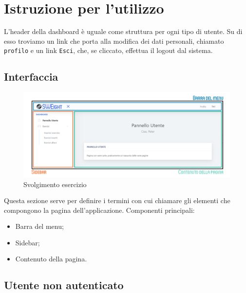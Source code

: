 \section{Istruzione per l'utilizzo}
  L'header della {dashboard} è uguale come struttura per ogni tipo di utente. Su di esso troviamo un link che porta alla modifica dei dati personali, chiamato \texttt{profilo} e un link \texttt{Esci}, che, se cliccato, effettua il logout dal sistema.



\subsection{Interfaccia}
    \begin{figure}[H]
        \centering
        \includegraphics[width=17cm]{sez/img/istruzioni/dashboardMod.png} 
        \caption{Svolgimento esercizio}\label{fig:1}
    \end{figure}
  Questa sezione serve per definire i termini con cui chiamare gli elementi che compongono la pagina dell'applicazione.
    Componenti principali:
    \begin{itemize}
        \item Barra del menu;
        \item {Sidebar};
        \item Contenuto della pagina.
    \end{itemize}


\subsection{Utente non autenticato}
